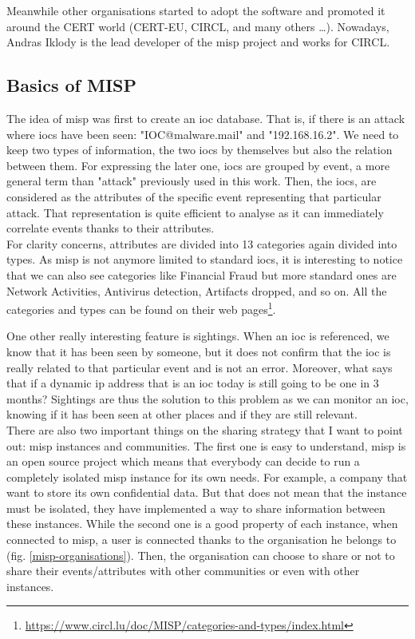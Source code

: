 \documentclass{eplmastersthesis}
\begin{document}
Meanwhile other organisations started to adopt the software and promoted it around the CERT world (CERT-EU, CIRCL, and many others …). Nowadays, Andras Iklody is the lead developer of the \gls{misp} project and works for CIRCL.\\

\subsection{Basics of MISP}
The idea of \gls{misp} was first to create an \gls{ioc} database. That is, if there is an attack where \glspl{ioc} have been seen: "IOC@malware.mail" and "192.168.16.2". We need to keep two types of information, the two \glspl{ioc} by themselves but also the relation between them. For expressing the later one, \glspl{ioc} are grouped by event, a more general term than "attack" previously used in this work.  Then, the \glspl{ioc}, are considered as the attributes of the specific event representing that particular attack.
That representation is quite efficient to analyse as it can immediately correlate events thanks to their attributes.\\

For clarity concerns, attributes are divided into 13 categories again divided into types. As \gls{misp} is not anymore limited to standard \glspl{ioc}, it is interesting to notice that we can also see categories like Financial Fraud but more standard ones are Network Activities, Antivirus detection, Artifacts dropped, and so on.
All the categories and types can be found on their web pages\footnote {\url{https://www.circl.lu/doc/MISP/categories-and-types/index.html}}.

One other really interesting feature is sightings. When an \gls{ioc} is referenced, we know that it has been seen by someone, but it does not confirm that the \gls{ioc} is really related to that particular event and is not an error. Moreover, what says that if a dynamic \gls{ip} address that is an \gls{ioc} today is still going to be one in 3 months? 
Sightings are thus the solution to this problem as we can monitor an \gls{ioc}, knowing if it has been seen at other places and if they are still relevant.\\


There are also two important things on the sharing strategy that I want to point out: \gls{misp} instances and communities. The first one is easy to understand, \gls{misp} is an open source project which means that everybody can decide to run a completely isolated \gls{misp} instance for its own needs. For example, a company that want to store its own confidential data. But that does not mean that the instance must be isolated, they have implemented a way to share information between these instances. While the second one is a good property of each instance, when connected to \gls{misp}, a user is connected thanks to the organisation he belongs to (fig. \ref{misp-organisations}). Then, the organisation can choose to share or not to share their events/attributes with other communities or even with other instances. \\ 
\end{document}
